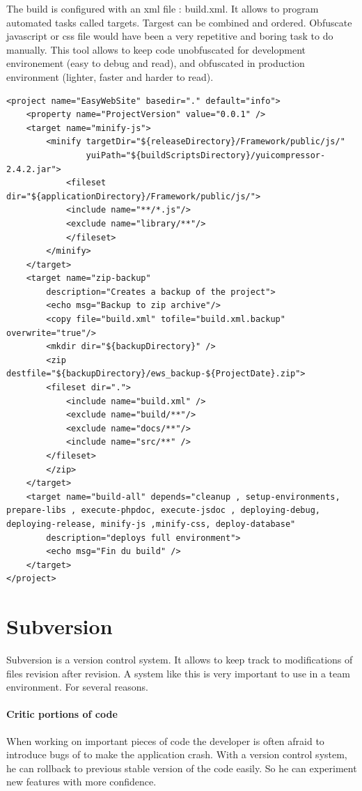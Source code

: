 The build is configured with an xml file : build.xml. It allows to program automated tasks called targets. Targest can be combined and ordered.
Obfuscate javascript or css file would have been a very repetitive and boring task to do manually. This tool allows to keep code unobfuscated for development environement (easy to debug and read), and obfuscated in production environment (lighter, faster and harder to read).

\lstset{language=Ant}
\begin{lstlisting}[label=phing-build,caption=Example of Phing build.xml]
<project name="EasyWebSite" basedir="." default="info">
	<property name="ProjectVersion" value="0.0.1" />
	<target name="minify-js">
		<minify targetDir="${releaseDirectory}/Framework/public/js/"
				yuiPath="${buildScriptsDirectory}/yuicompressor-2.4.2.jar">
			<fileset dir="${applicationDirectory}/Framework/public/js/">
			<include name="**/*.js"/>
			<exclude name="library/**"/>
			</fileset>
		</minify>
	</target>	
	<target name="zip-backup"
		description="Creates a backup of the project">
		<echo msg="Backup to zip archive"/>
		<copy file="build.xml" tofile="build.xml.backup" overwrite="true"/>
		<mkdir dir="${backupDirectory}" />				
		<zip destfile="${backupDirectory}/ews_backup-${ProjectDate}.zip">
		<fileset dir=".">
			<include name="build.xml" />
			<exclude name="build/**"/>
			<exclude name="docs/**"/>
			<include name="src/**" />			
		</fileset>
		</zip>
	</target>
	<target name="build-all" depends="cleanup , setup-environments, prepare-libs , execute-phpdoc, execute-jsdoc , deploying-debug, deploying-release, minify-js ,minify-css, deploy-database"
		description="deploys full environment">       
		<echo msg="Fin du build" />		
	</target>		
</project>
\end{lstlisting}

\section{Subversion}

Subversion is a version control system. It allows to keep track to modifications of files revision after revision. A system like this is very important to use in a team environment. For several reasons.

\paragraph*{Critic portions of code}
When working on important pieces of code the developer is often afraid to introduce bugs of to make the application crash. With a version control system, he can rollback to previous stable version of the code easily. So he can experiment new features with more confidence. 

